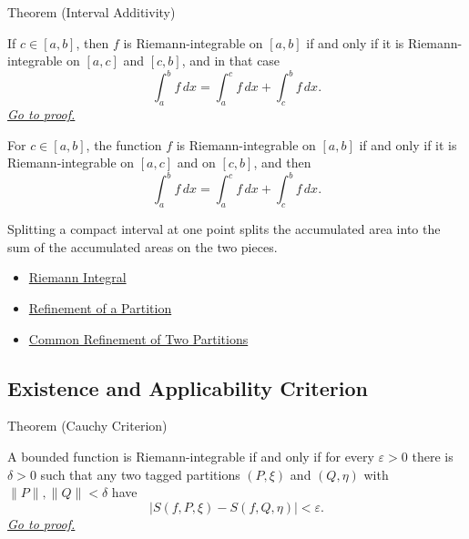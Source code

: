 \begin{theorembox}{Theorem (Interval Additivity)}
\begin{theorem}
\label{thm:riemann-integral-interval-additivity}
If \(c\in[a,b]\), then \(f\) is Riemann-integrable on \([a,b]\) if and only if
it is Riemann-integrable on \([a,c]\) and \([c,b]\), and in that case
\[
  \int_a^b f\,dx=\int_a^c f\,dx+\int_c^b f\,dx .
\]
\hyperref[prf:riemann-integral-interval-additivity]{\textit{Go to proof.}}
\end{theorem}
\end{theorembox}

\begin{remark*}
For \(c\in[a,b]\), the function \(f\) is Riemann-integrable on \([a,b]\) if
and only if it is Riemann-integrable on \([a,c]\) and on \([c,b]\), and then
\[
  \int_a^b f\,dx=\int_a^c f\,dx+\int_c^b f\,dx .
\]
\end{remark*}

\begin{remark*}[Interpretation]
Splitting a compact interval at one point splits the accumulated area into the
sum of the accumulated areas on the two pieces.
\end{remark*}

\begin{dependencies}
\begin{itemize}
  \item \hyperref[def:riemann-integral]{Riemann Integral}
  \item \hyperref[def:partition-refinement]{Refinement of a Partition}
  \item \hyperref[lem:common-refinement-partitions]{Common Refinement of Two Partitions}
\end{itemize}
\end{dependencies}

\subsection*{Existence and Applicability Criterion}

\begin{theorembox}{Theorem (Cauchy Criterion)}
\begin{theorem}
\label{thm:riemann-cauchy-criterion}
A bounded function is Riemann-integrable if and only if for every
\(\varepsilon>0\) there is \(\delta>0\) such that any two tagged partitions
\((P,\xi)\) and \((Q,\eta)\) with \(\|P\|,\|Q\|<\delta\) have
\[
  |S(f,P,\xi)-S(f,Q,\eta)|<\varepsilon.
\]
\hyperref[prf:riemann-cauchy-criterion]{\textit{Go to proof.}}
\end{theorem}
\end{theorembox}

